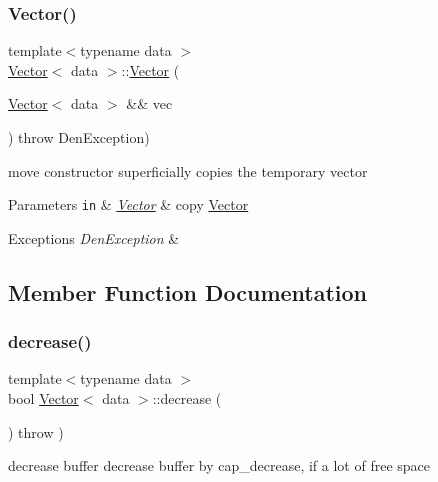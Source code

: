 \subsubsection{\texorpdfstring{Vector()}{Vector()}\hspace{0.1cm}{\footnotesize\ttfamily [5/5]}}
{\footnotesize\ttfamily template$<$typename data $>$ \\
\hyperlink{classVector}{Vector}$<$ data $>$\+::\hyperlink{classVector}{Vector} (\begin{DoxyParamCaption}\item[{\hyperlink{classVector}{Vector}$<$ data $>$ \&\&}]{vec }\end{DoxyParamCaption}) throw  Den\+Exception) }



move constructor  superficially copies the temporary vector 


\begin{DoxyParams}[1]{Parameters}
\mbox{\tt in}  & {\em \hyperlink{classVector}{Vector}} & copy \hyperlink{classVector}{Vector} \\
\hline
\end{DoxyParams}

\begin{DoxyExceptions}{Exceptions}
{\em Den\+Exception} & \\
\hline
\end{DoxyExceptions}


\subsection{Member Function Documentation}
\mbox{\label{classVector_a770a5b403dcb82ea6954cda918d278d6}} 
\subsubsection{\texorpdfstring{decrease()}{decrease()}}
{\footnotesize\ttfamily template$<$typename data $>$ \\
bool \hyperlink{classVector}{Vector}$<$ data $>$\+::decrease (\begin{DoxyParamCaption}{ }\end{DoxyParamCaption}) throw  ) \hspace{0.3cm}{\ttfamily [private]}}



decrease buffer  decrease buffer by cap\+\_\+decrease, if a lot of free space 

